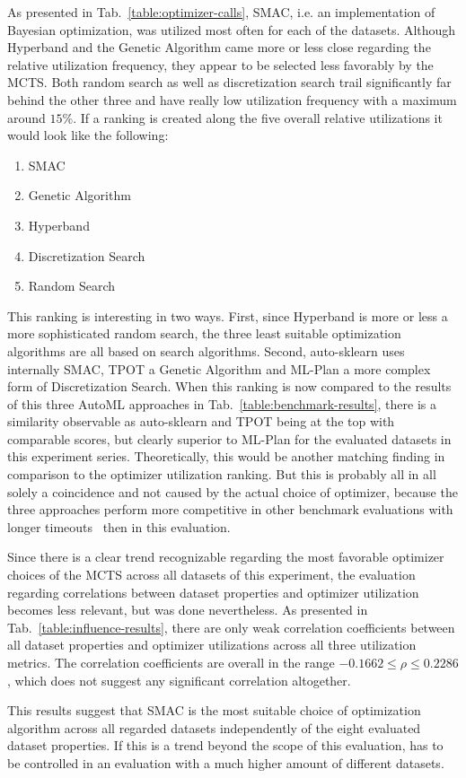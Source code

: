 As presented in Tab.~\ref{table:optimizer-calls}, SMAC, i.e. an implementation of Bayesian optimization, was utilized most often for each of the datasets.
Although Hyperband and the Genetic Algorithm came more or less close regarding the relative utilization frequency, they appear to be selected less favorably by the MCTS.
Both random search as well as discretization search trail significantly far behind the other three and have really low utilization frequency with a maximum around $15\%$.\newline
If a ranking is created along the five overall relative utilizations it would look like the following:
\begin{enumerate}
    \item SMAC
    \item Genetic Algorithm
    \item Hyperband
    \item Discretization Search
    \item Random Search
\end{enumerate}
This ranking is interesting in two ways.
First, since Hyperband is more or less a more sophisticated random search, the three least suitable optimization algorithms are all based on search algorithms.\newline
Second, auto-sklearn uses internally SMAC, TPOT a Genetic Algorithm and ML-Plan a more complex form of Discretization Search.
When this ranking is now compared to the results of this three AutoML approaches in Tab.~\ref{table:benchmark-results}, there is a similarity observable as auto-sklearn and TPOT being at the top with comparable scores, but clearly superior to ML-Plan for the evaluated datasets in this experiment series.
Theoretically, this would be another matching finding in comparison to the optimizer utilization ranking.
But this is probably all in all solely a coincidence and not caused by the actual choice of optimizer, because the three approaches perform more competitive in other benchmark evaluations with longer timeouts~\cite{Mohr-ML-Plan} then in this evaluation.

Since there is a clear trend recognizable regarding the most favorable optimizer choices of the MCTS across all datasets of this experiment, the evaluation regarding correlations between dataset properties and optimizer utilization becomes less relevant, but was done nevertheless.\newline
As presented in Tab.~\ref{table:influence-results}, there are only weak correlation coefficients between all dataset properties and optimizer utilizations across all three utilization metrics.
The correlation coefficients are overall in the range $-0.1662 \leq \rho \leq 0.2286$, which does not suggest any significant correlation altogether.

This results suggest that SMAC is the most suitable choice of optimization algorithm across all regarded datasets independently of the eight evaluated dataset properties.
If this is a trend beyond the scope of this evaluation, has to be controlled in an evaluation with a much higher amount of different datasets.
